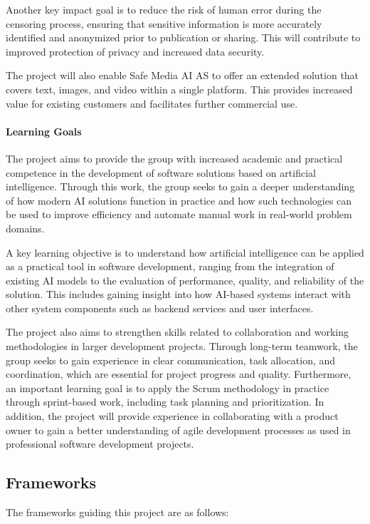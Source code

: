 Another key impact goal is to reduce the risk of human error during the censoring process, ensuring that sensitive information is more accurately identified and anonymized prior to publication or sharing. This will contribute to improved protection of privacy and increased data security.

The project will also enable Safe Media AI AS to offer an extended solution that covers text, images, and video within a single platform. This provides increased value for existing customers and facilitates further commercial use.

\paragraph{Learning Goals}
The project aims to provide the group with increased academic and practical competence in the development of software solutions based on artificial intelligence. Through this work, the group seeks to gain a deeper understanding of how modern AI solutions function in practice and how such technologies can be used to improve efficiency and automate manual work in real-world problem domains.

A key learning objective is to understand how artificial intelligence can be applied as a practical tool in software development, ranging from the integration of existing AI models to the evaluation of performance, quality, and reliability of the solution. This includes gaining insight into how AI-based systems interact with other system components such as backend services and user interfaces.

The project also aims to strengthen skills related to collaboration and working methodologies in larger development projects. Through long-term teamwork, the group seeks to gain experience in clear communication, task allocation, and coordination, which are essential for project progress and quality. Furthermore, an important learning goal is to apply the Scrum methodology in practice through sprint-based work, including task planning and prioritization. In addition, the project will provide experience in collaborating with a product owner to gain a better understanding of agile development processes as used in professional software development projects.

\subsection{Frameworks}

The frameworks guiding this project are as follows:


